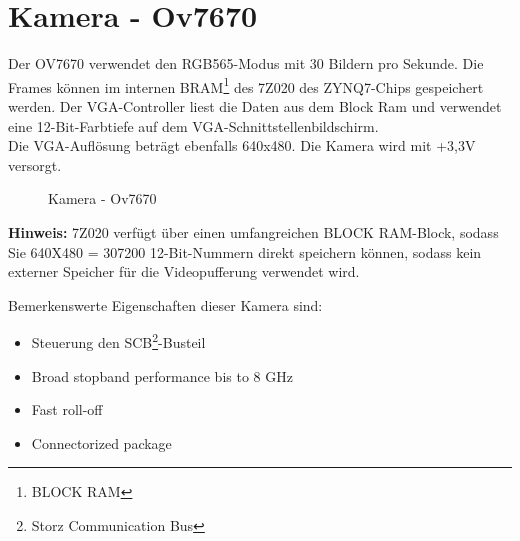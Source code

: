\documentclass[a4paper]{report}
\begin{document}
\section{Kamera - Ov7670}
Der OV7670 verwendet den RGB565-Modus mit 30 Bildern pro Sekunde. Die Frames können im internen BRAM\footnote{BLOCK RAM} des 7Z020 des ZYNQ7-Chips gespeichert werden. Der VGA-Controller liest die Daten aus dem Block Ram und verwendet eine 12-Bit-Farbtiefe auf dem VGA-Schnittstellenbildschirm.\\
Die VGA-Auflösung beträgt ebenfalls 640x480. Die Kamera wird mit +3,3V versorgt.

		\begin{figure}[H]
			\centering
			\qquad
			\caption{Kamera - Ov7670}
			\label{fig:Kamera - Ov7670}
		\end{figure}


\textbf{Hinweis: } 7Z020 verfügt über einen umfangreichen BLOCK RAM-Block, sodass Sie 640X480 = 307200 12-Bit-Nummern direkt speichern können, sodass kein externer Speicher für die Videopufferung verwendet wird.

Bemerkenswerte Eigenschaften dieser Kamera sind:
	\begin{itemize}
		\item Steuerung den SCB\footnote{Storz Communication Bus}-Busteil
		\item Broad stopband performance bis to 8 GHz
		\item Fast roll-off
		\item Connectorized package
	\end{itemize}
\end{document}
